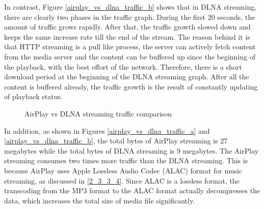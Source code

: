In contrast, Figure \ref{airplay_vs_dlna_traffic_b} shows that in DLNA
streaming, there are clearly two phases in the traffic graph. During the first
20 seconds, the amount of traffic grows rapidly. After that, the traffic growth slowed down and
keeps the same increase rate till the end of the stream. The reason behind it
is that HTTP streaming is a pull like process, the server can actively fetch
content from the media server and the content can be buffered up since the
beginning of the playback, with the best effort of the network. Therefore,
there is a short download period at the beginning of the DLNA streaming graph.
After all the content is buffered already, the traffic growth is the result of
constantly updating of playback status.
\begin{figure}[hb]
\caption{AirPlay vs DLNA streaming traffic
comparison \label{airplay_vs_dlna_traffic}}
\end{figure}
\clearpage

In addition, as shown in Figures \ref{airplay_vs_dlna_traffic_a} and
\ref{airplay_vs_dlna_traffic_b}, the total bytes of AirPlay streaming is 27
megabytes while the total bytes of DLNA streaming is 9 megabytes. The
AirPlay streaming consumes two times more traffic than the DLNA streaming. This
is because AirPlay uses Apple Lossless Audio Codec (ALAC) format for music
streaming, as discussed in \ref{2_3_3_4}. Since ALAC is a lossless format, the
transcoding from the MP3 format to the ALAC format actually decompresses the
data, which increases the total size of media file significantly.

